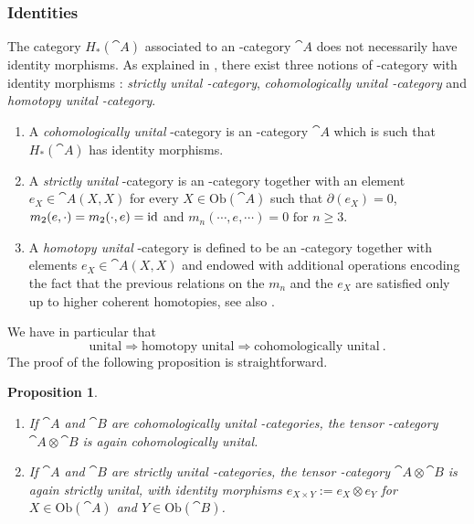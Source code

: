 \documentclass[10pt]{amsart}
\newtheorem{proposition}[definition]{Proposition}
\theoremstyle{remark}
\begin{document}
\subsubsection{Identities}

The category $H_*(\cat{A})$ associated to an \Ainf -category $\cat{A}$ does not necessarily have identity morphisms. As explained in \cite[Section 1.2]{Seidel08}, there exist three notions of \Ainf -category with identity morphisms : \textit{strictly unital \Ainf -category}, \textit{cohomologically unital \Ainf -category} and \textit{homotopy unital \Ainf -category}. 
\begin{enumerate}[leftmargin=*]
\item A \textit{cohomologically unital} \Ainf -category is an \Ainf -category $\cat{A}$ which is such that $H_*(\cat{A})$ has identity morphisms.
\item A \textit{strictly unital} \Ainf -category is an \Ainf -category together with an element $e_X \in \cat{A} (X ,X )$ for every $X \in \mathrm{Ob}(\cat{A})$ such that $\partial (e_X) = 0$, $m_2 (e , \cdot ) = m_2 (\cdot , e ) = \mathrm{id}$ and $m_n ( \cdots , e , \cdots ) = 0 \text { for } n \geq 3$.
\item A \textit{homotopy unital} \Ainf -category is defined to be an \Ainf -category together with elements $e_X \in \cat{A} (X ,X )$ and endowed with additional operations encoding the fact that the previous relations on the $m_n$ and the $e_X$ are satisfied only up to higher coherent homotopies, see also \cite[Section 6.1]{HirshMilles12}.
\end{enumerate}
We have in particular that
\[  \text{unital} \Rightarrow \text{homotopy unital} \Rightarrow \text{cohomologically unital} \ . \]
The proof of the following proposition is straightforward.

\begin{proposition} $ $
\begin{enumerate}[leftmargin=*]
\item If $\cat{A}$ and $\cat{B}$ are cohomologically unital \Ainf -categories, the tensor \Ainf -category $\cat{A} \otimes \cat{B}$ is again cohomologically unital. 
\item If $\cat{A}$ and $\cat{B}$ are strictly unital \Ainf -categories, the tensor \Ainf -category $\cat{A} \otimes \cat{B}$ is again strictly unital, with identity morphisms $e_{X \times Y} := e_X \otimes e_Y$ for  $X \in \mathrm{Ob}(\cat{A})$ and $Y \in \mathrm{Ob}(\cat{B})$.
\end{enumerate}
\end{proposition}
\end{document}
